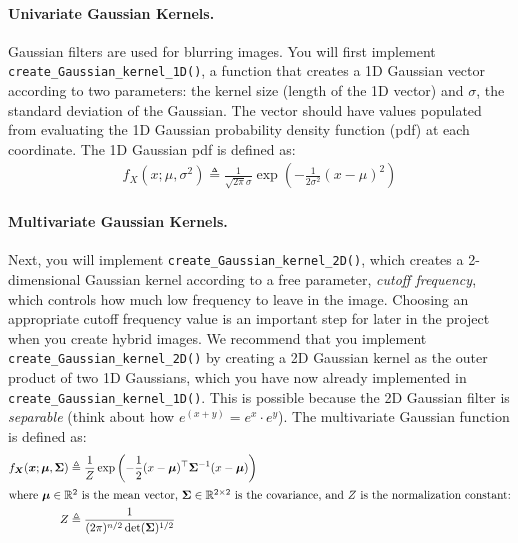 \documentclass{article}
\begin{document}
\paragraph{Univariate Gaussian Kernels.}
Gaussian filters are used for blurring images. You will first implement \lstinline{create_Gaussian_kernel_1D()}, a function that creates a 1D Gaussian vector according to two parameters: the kernel size (length of the 1D vector) and $\sigma$, the standard deviation of the Gaussian. The vector should have values populated from evaluating the 1D Gaussian probability density function (pdf) at each coordinate. The 1D Gaussian pdf is defined as:
\begin{align}
f_X(x; \mu, \sigma^2) \triangleq \frac{1}{\sqrt{2\pi} \sigma} \exp \left( -\frac{1}{2\sigma^2}(x - \mu)^2 \right)
\end{align}

\paragraph{Multivariate Gaussian Kernels.} 
Next, you will implement \lstinline{create_Gaussian_kernel_2D()}, which creates a 2-dimensional Gaussian kernel according to a free parameter, \textit{cutoff frequency}, which controls how much low frequency to leave in the image. Choosing an appropriate cutoff frequency value is an important step for later in the project when you create hybrid images. We recommend that you implement \lstinline{create_Gaussian_kernel_2D()} by creating a 2D Gaussian kernel as the outer product of two 1D Gaussians, which you have now already implemented in \lstinline{create_Gaussian_kernel_1D()}. This is possible because the 2D Gaussian filter is \emph{separable} (think about how $e^{(x+y)} = e^x \cdot e^y$). The multivariate Gaussian function is defined as:
\begin{align}
    f_{\boldsymbol{X}}(\boldsymbol{x}; \boldsymbol{\mu}, \boldsymbol{\Sigma}) &\triangleq \frac{1}{Z} \exp\left(-\frac{1}{2}(x - \boldsymbol{\mu})^\top \boldsymbol{\Sigma}^{-1} (x - \boldsymbol{\mu})\right) \label{eqn:normal} \\ 
    \shortintertext{where \(\boldsymbol{\mu} \in \mathbb{R}^2\) is the mean vector, \(\boldsymbol{\Sigma} \in \mathbb{R}^{2 \times 2}\) is the covariance, and \(Z\) is the normalization constant:}
    Z &\triangleq \frac{1}{(2\pi)^{n / 2} \det(\boldsymbol{\Sigma})^{1 / 2}}
\end{align}
\end{document}
